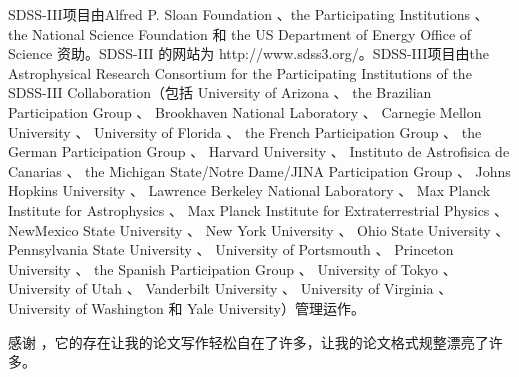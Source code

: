 \begin{acknowledgement}
  SDSS-III项目由Alfred P. Sloan Foundation 、the Participating Institutions 、 the National Science Foundation 和 the US Department of Energy Office of Science 资助。SDSS-III 的网站为 http://www.sdss3.org/。SDSS-III项目由the Astrophysical Research Consortium for the Participating Institutions of the SDSS-III Collaboration（包括 University of Arizona 、 the Brazilian Participation Group 、 Brookhaven National Laboratory 、 Carnegie Mellon University 、 University of Florida 、 the French Participation Group 、 the German Participation Group 、 Harvard University 、 Instituto de Astrofisica de Canarias 、 the Michigan State/Notre Dame/JINA Participation Group 、 Johns Hopkins University 、 Lawrence Berkeley National Laboratory 、 Max Planck Institute for Astrophysics 、 Max Planck Institute for Extraterrestrial Physics 、 NewMexico State University 、 New York University 、 Ohio State University 、 Pennsylvania State University 、 University of Portsmouth 、 Princeton University 、 the Spanish Participation Group 、 University of Tokyo 、 University of Utah 、 Vanderbilt University 、 University of Virginia 、 University of Washington 和 Yale University）管理运作。

  感谢 \thuthesis，它的存在让我的论文写作轻松自在了许多，让我的论文格式规整漂亮了许多。

\end{acknowledgement}

